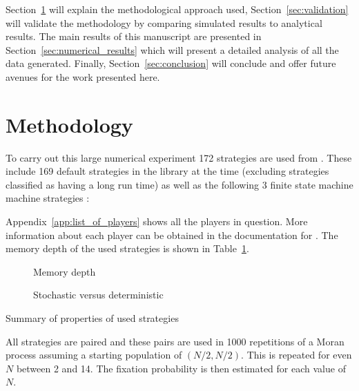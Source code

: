 \documentclass{article}
\begin{document}
Section~\ref{sec:methodology} will explain the methodological approach used,
Section~\ref{sec:validation} will validate the methodology by comparing
simulated results to analytical results. The main results of this manuscript are
presented in Section~\ref{sec:numerical_results} which will present a detailed
analysis of all the data generated. Finally, Section~\ref{sec:conclusion} will
conclude and offer future avenues for the work presented here.

\section{Methodology}\label{sec:methodology}

To carry out this large numerical experiment 172 strategies are used from
\cite{axelrodproject}. These include 169 default strategies in the library at
the time (excluding strategies classified as having a long run time) as well as
the following 3 finite state machine machine strategies \cite{Ashlock2006}:


Appendix~\ref{app:list_of_players} shows all the players in question. More
information about each player can be obtained in the documentation for
\cite{axelrodproject}. The memory depth of the used strategies is shown in
Table~\ref{tbl:memory_depth_count}.

\begin{table}[!hbtp]
    \centering
        \begin{subfigure}[t]{\textwidth}
            \centering
                
                \caption{Memory depth}
                \label{tbl:memory_depth_count}
        \end{subfigure}
        \vspace{.5cm}

        \begin{subfigure}[t]{\textwidth}
            \centering
                
                \caption{Stochastic versus deterministic}
                \label{tbl:stochastic_count}
        \end{subfigure}
        \caption{Summary of properties of used strategies}
\end{table}

All strategies are paired and these pairs are used in 1000 repetitions of a
Moran process assuming a starting population of \((N/2, N/2)\). This is repeated
for even \(N\) between 2 and 14. The fixation probability is then estimated for
each value of \(N\).
\end{document}
